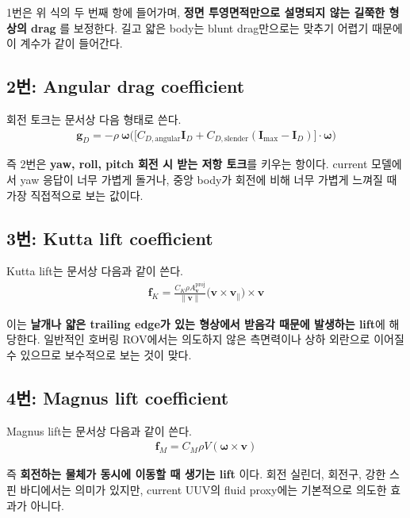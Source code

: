 \documentclass[11pt,a4paper]{article}
\begin{document}
1번은 위 식의 두 번째 항에 들어가며, \textbf{정면 투영면적만으로 설명되지 않는 길쭉한 형상의 drag} 를 보정한다. 길고 얇은 body는 blunt drag만으로는 맞추기 어렵기 때문에 이 계수가 같이 들어간다.

\subsection{2번: Angular drag coefficient}

회전 토크는 문서상 다음 형태로 쓴다.
\begin{align*}
\mathbf{g}_D
=
- \rho ~ \boldsymbol{\omega}
\Big(
\big[
C_{D,\text{angular}} \mathbf{I}_D
+
C_{D,\text{slender}}(\mathbf{I}_{\max}-\mathbf{I}_D)
\big]
\cdot \boldsymbol{\omega}
\Big)
\end{align*}

즉 2번은 \textbf{yaw, roll, pitch 회전 시 받는 저항 토크}를 키우는 항이다. current 모델에서 yaw 응답이 너무 가볍게 돌거나, 중앙 body가 회전에 비해 너무 가볍게 느껴질 때 가장 직접적으로 보는 값이다.

\subsection{3번: Kutta lift coefficient}

Kutta lift는 문서상 다음과 같이 쓴다.
\begin{align*}
\mathbf{f}_K
=
\frac{C_K \rho A^{\text{proj}}_{\mathbf{v}}}{\|\mathbf{v}\|}
\big(\mathbf{v} \times \mathbf{v}_\parallel\big)\times\mathbf{v}
\end{align*}

이는 \textbf{날개나 얇은 trailing edge가 있는 형상에서 받음각 때문에 발생하는 lift}에 해당한다. 일반적인 호버링 ROV에서는 의도하지 않은 측면력이나 상하 외란으로 이어질 수 있으므로 보수적으로 보는 것이 맞다.

\subsection{4번: Magnus lift coefficient}

Magnus lift는 문서상 다음과 같이 쓴다.
\begin{align*}
\mathbf{f}_M = C_M \rho V (\boldsymbol{\omega} \times \mathbf{v})
\end{align*}

즉 \textbf{회전하는 물체가 동시에 이동할 때 생기는 lift} 이다. 회전 실린더, 회전구, 강한 스핀 바디에서는 의미가 있지만, current UUV의 fluid proxy에는 기본적으로 의도한 효과가 아니다.
\end{document}
